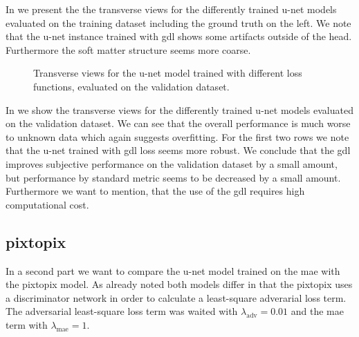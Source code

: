 In  we present the the transverse views for the
differently trained u-net models evaluated on the training dataset including
the ground truth on the left. We note that the u-net instance trained with
\gls{gdl} shows some artifacts outside of the head. Furthermore the soft
matter structure seems more coarse.
\begin{figure}[h]
  \centering
  \begin{adjustbox}{width=\linewidth}
  \end{adjustbox}
  \caption{Transverse views for the u-net model trained with different
    loss functions, evaluated on the validation dataset.
  }\label{fig:unet:validation}
\end{figure}
In  we show the transverse views for the differently
trained u-net models evaluated on the validation dataset. We can see that
the overall performance is much worse to unknown data which again suggests
overfitting. For the first two rows we note that the u-net trained with
\gls{gdl} loss seems more robust. We conclude that the \gls{gdl} improves
subjective performance on the validation dataset by a small amount, but
performance by standard metric seems to be decreased by a small amount.
Furthermore we want to mention, that the use of the \gls{gdl} requires high
computational cost.

\subsection{pixtopix}

In a second part we want to compare the u-net model trained on the \gls{mae}
with the pixtopix model. As already noted both models differ in that the
pixtopix uses a discriminator network in order to calculate a least-square
adverarial loss term. The adversarial least-square loss term was waited with
$\lambda_\text{adv}=0.01$ and the \gls{mae} term with $\lambda_\text{mae}=1$.

